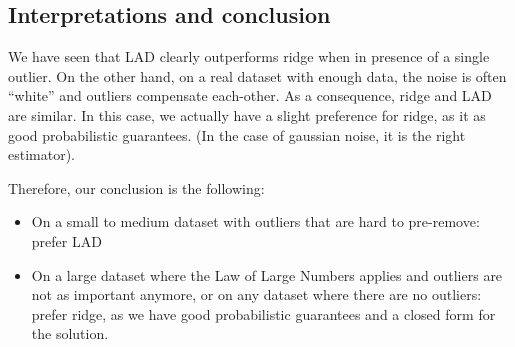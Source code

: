 \subsection{Interpretations and conclusion}
We have seen that LAD clearly outperforms ridge when in presence of a single outlier. On the other hand, on a real dataset with enough data, the noise is often ``white'' and outliers compensate each-other. As a consequence, ridge and LAD are similar. In this case, we actually have a slight preference for ridge, as it as good probabilistic guarantees. (In the case of gaussian noise, it is the right estimator).

Therefore, our conclusion is the following:
\begin{itemize}
    \item On a small to medium dataset with outliers that are hard to pre-remove: prefer LAD
    \item On a large dataset where the Law of Large Numbers applies and outliers are not as important anymore, or on any dataset where there are no outliers: prefer ridge, as we have good probabilistic guarantees and a closed form for the solution.
\end{itemize}
